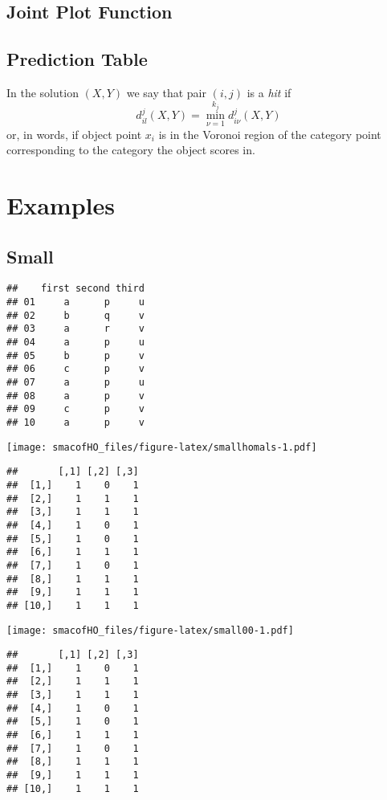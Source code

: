 \documentclass[
  12pt,
]{article}
\begin{document}
\subsection{Joint Plot Function}\label{joint-plot-function}

\subsection{Prediction Table}\label{prediction-table}

In the solution \((X,Y)\) we say that pair \((i,j)\) is a \emph{hit} if
\[
d_{il}^j(X,Y)=\min_{\nu=1}^{k_j}d_{i\nu}^j(X,Y)
\]
or, in words, if object point \(x_i\) is in the Voronoi region of the category point
corresponding to the category the object scores in.

\section{Examples}\label{examples}

\subsection{Small}\label{small}

\begin{verbatim}
##    first second third
## 01     a      p     u
## 02     b      q     v
## 03     a      r     v
## 04     a      p     u
## 05     b      p     v
## 06     c      p     v
## 07     a      p     u
## 08     a      p     v
## 09     c      p     v
## 10     a      p     v
\end{verbatim}

\texttt{[image: smacofHO\_files/figure-latex/smallhomals-1.pdf]}

\begin{verbatim}
##       [,1] [,2] [,3]
##  [1,]    1    0    1
##  [2,]    1    1    1
##  [3,]    1    1    1
##  [4,]    1    0    1
##  [5,]    1    0    1
##  [6,]    1    1    1
##  [7,]    1    0    1
##  [8,]    1    1    1
##  [9,]    1    1    1
## [10,]    1    1    1
\end{verbatim}

\texttt{[image: smacofHO\_files/figure-latex/small00-1.pdf]}

\begin{verbatim}
##       [,1] [,2] [,3]
##  [1,]    1    0    1
##  [2,]    1    1    1
##  [3,]    1    1    1
##  [4,]    1    0    1
##  [5,]    1    0    1
##  [6,]    1    1    1
##  [7,]    1    0    1
##  [8,]    1    1    1
##  [9,]    1    1    1
## [10,]    1    1    1
\end{verbatim}
\end{document}

